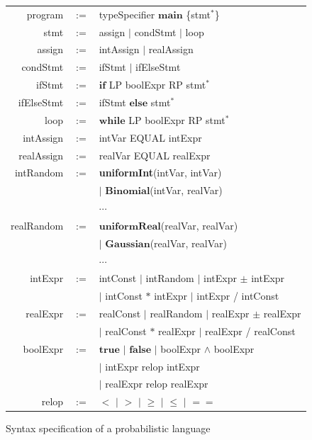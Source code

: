 \documentclass[conference]{IEEEtran}
\begin{document}
\begin{figure}[ht]
	\centering
	\begin{tabular*}{0.5\textwidth}{rcl}
		\hline
		program\!&\!$:=$\!& typeSpecifier $\textbf{main}$ \{stmt$^*$\} \\
		stmt \!&\!$:=$\!& assign $\mid$ condStmt $\mid$ loop \\
		assign \!&\!$:=$\!& intAssign $\mid$ realAssign \\
		condStmt \!&\!$:=$\!& ifStmt $\mid$ ifElseStmt\\
		ifStmt \!&\!$:=$\!& $\textbf{if}$ LP boolExpr RP stmt$^*$\\
		ifElseStmt \!&\!$:=$\!& ifStmt $\textbf{else}$ stmt$^*$\\
		loop \!&\!$:=$\!& $\textbf{while}$ LP boolExpr RP stmt$^*$\\
		intAssign \!&\!$:=$\!&  intVar EQUAL intExpr \\
		realAssign \!&\!$:=$\!& realVar EQUAL realExpr \\
		intRandom \!&\!$:=$\!& \textbf{uniformInt}(intVar, intVar)\\
		&  & $\mid$ $\textbf{Binomial}$(intVar, realVar)\\
		&  & $\cdots$ \\
		realRandom\! &\!$:=$\!&$\textbf{uniformReal}$(realVar, realVar)\\
		&  & $\mid$ $\textbf{Gaussian}$(realVar, realVar)\\
		&  & $\cdots$ \\
		intExpr \!&\!$:=$\!&\!intConst \!$\mid$\! intRandom \!$\mid$\! intExpr\! $\pm$\! intExpr\\
		&  & $\mid$ intConst $\ast$ intExpr $\mid$ intExpr \!/\! intConst\\
		realExpr \!&\!$:=$\!&\!realConst \!\!$\mid$\!\! realRandom \!\!$\mid$\!\! realExpr \!$\pm$\! realExpr\\
		&  & \!$\mid$ \!realConst \!$\ast$\! realExpr $\mid$ realExpr \!/\! realConst\\
		boolExpr\!&\!$:=$\!& $\textbf{true}$ $\mid$ $\textbf{false}$ $\mid$ boolExpr $\wedge$ boolExpr \\
		& & $\mid$ intExpr relop intExpr \\
		& & $\mid$ realExpr relop realExpr\\
		relop \!&\!$:=$\!& $<$  $\mid$  $>$ $\mid$ $\geq$ $\mid$ $\leq$ $\mid$ $==$\\
		\hline
	\end{tabular*}
	\caption{Syntax specification of a probabilistic language}	
	\label{syntax}
\end{figure}
\end{document}
